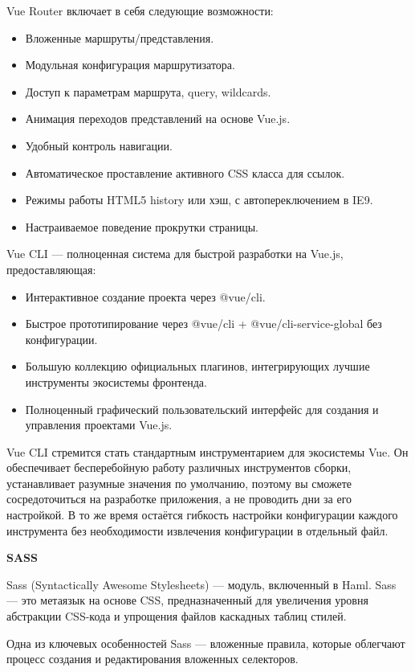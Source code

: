 Vue Router включает в себя следующие возможности:
\begin{itemize}
    \item Вложенные маршруты/представления.
    \item Модульная конфигурация маршрутизатора.
    \item Доступ к параметрам маршрута, query, wildcards.
    \item Анимация переходов представлений на основе Vue.js.
    \item Удобный контроль навигации.
    \item Автоматическое проставление активного CSS класса для ссылок.
    \item Режимы работы HTML5 history или хэш, с автопереключением в IE9.
    \item Настраиваемое поведение прокрутки страницы.
\end{itemize}

Vue CLI — полноценная система для быстрой разработки на Vue.js, предоставляющая:
\begin{itemize}
    \item Интерактивное создание проекта через @vue/cli.
    \item Быстрое прототипирование через @vue/cli + @vue/cli-service-global без конфигурации.
    \item Большую коллекцию официальных плагинов, интегрирующих лучшие инструменты экосистемы фронтенда.
    \item Полноценный графический пользовательский интерфейс для создания и управления проектами Vue.js.
\end{itemize}

Vue CLI стремится стать стандартным инструментарием для экосистемы Vue. Он обеспечивает бесперебойную работу различных инструментов сборки, устанавливает разумные значения по умолчанию, поэтому вы сможете сосредоточиться на разработке приложения, а не проводить дни за его настройкой. В то же время остаётся гибкость настройки конфигурации каждого инструмента без необходимости извлечения конфигурации в отдельный файл.

\bigskip
\textbf{SASS}

Sass (Syntactically Awesome Stylesheets) — модуль, включенный в Haml. Sass — это метаязык на основе CSS, предназначенный для увеличения уровня абстракции CSS-кода и упрощения файлов каскадных таблиц стилей.

Одна из ключевых особенностей Sass — вложенные правила, которые облегчают процесс создания и редактирования вложенных селекторов.

